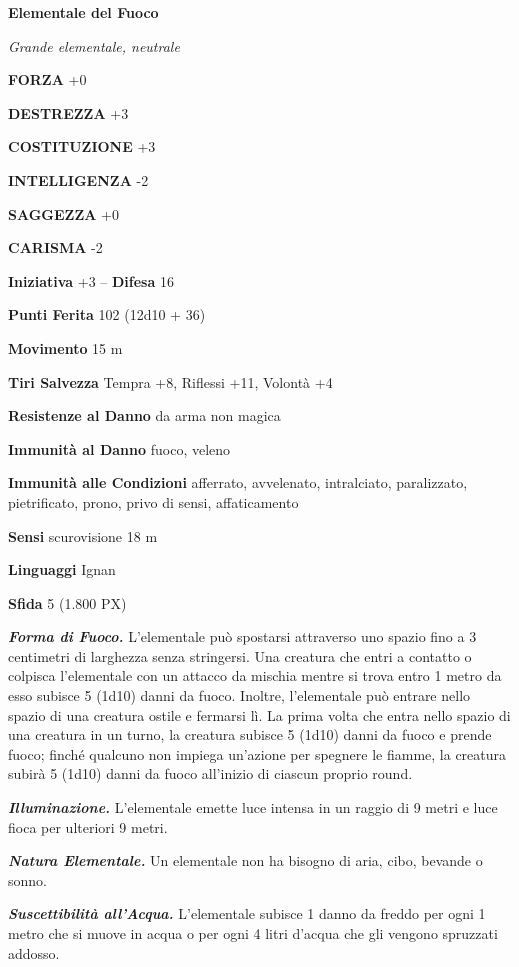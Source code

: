 \begin{multicols}{2}
	\medskip{}\textbf{Elementale del Fuoco}

	\textit{Grande elementale, neutrale}

	\textbf{FORZA} +0

	\textbf{DESTREZZA} +3

	\textbf{COSTITUZIONE} +3

	\textbf{INTELLIGENZA} -2

	\textbf{SAGGEZZA} +0

	\textbf{CARISMA} -2

	\textbf{Iniziativa} +3 -- \textbf{Difesa} 16

	\textbf{Punti Ferita} 102 (12d10 + 36)

	\textbf{Movimento} 15 m

	\textbf{Tiri Salvezza} Tempra +8, Riflessi +11, Volontà +4

	\textbf{Resistenze al Danno} da arma non magica

	\textbf{Immunità al Danno} fuoco, veleno

	\textbf{Immunità alle Condizioni} afferrato, avvelenato, intralciato, paralizzato, pietrificato, prono, privo di sensi, affaticamento

	\textbf{Sensi} scurovisione 18 m

	\textbf{Linguaggi} Ignan

	\textbf{Sfida} 5 (1.800 PX)

	\textit{\textbf{Forma di Fuoco.}} L'elementale può spostarsi attraverso uno spazio fino a 3 centimetri di larghezza senza stringersi. Una creatura che entri a contatto o colpisca l'elementale con un attacco da mischia mentre si trova entro 1 metro da esso subisce 5 (1d10) danni da fuoco. Inoltre, l'elementale può entrare nello spazio di una creatura ostile e fermarsi lì. La prima volta che entra nello spazio di una creatura in un turno, la creatura subisce 5 (1d10) danni da fuoco e prende fuoco; finché qualcuno non impiega un'azione per spegnere le fiamme, la creatura subirà 5 (1d10) danni da fuoco all'inizio di ciascun proprio round.

	\textit{\textbf{Illuminazione.}} L'elementale emette luce intensa in un raggio di 9 metri e luce fioca per ulteriori 9 metri.

	\textit{\textbf{Natura Elementale.}} Un elementale non ha bisogno di aria, cibo, bevande o sonno.

	\textit{\textbf{Suscettibilità all'Acqua.}} L'elementale subisce 1 danno da freddo per ogni 1 metro che si muove in acqua o per ogni 4 litri d'acqua che gli vengono spruzzati addosso.


\end{multicols}
